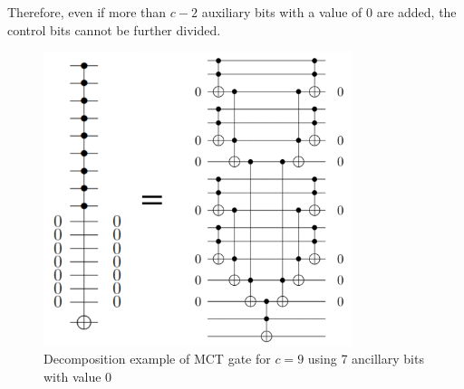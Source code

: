 Therefore, even if more than $c-2$ auxiliary bits with a value of 0 are added,
the control bits cannot be further divided. 
\begin{figure}[tbp]
\centering
\includegraphics[width=9cm]{img/niemann_c_2.pdf}
\caption{Decomposition example of MCT gate for $c=9$ using 7 ancillary bits with value 0}
\label{niemann_c_2}
\end{figure}
